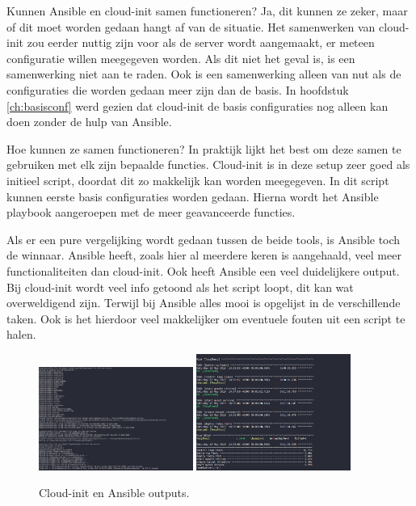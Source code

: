 \newpage
Kunnen Ansible en cloud-init samen functioneren? Ja, dit kunnen ze zeker, maar of dit moet worden gedaan hangt af van de situatie. Het samenwerken van cloud-init zou eerder nuttig zijn voor als de server wordt aangemaakt, er meteen configuratie willen meegegeven worden. Als dit niet het geval is, is een samenwerking niet aan te raden. Ook is een samenwerking alleen van nut als de configuraties die worden gedaan meer zijn dan de basis. In hoofdstuk \ref{ch:basisconf} werd gezien dat cloud-init de basis configuraties nog alleen kan doen zonder de hulp van Ansible.

Hoe kunnen ze samen functioneren? In praktijk lijkt het best om deze samen te gebruiken met elk zijn bepaalde functies. Cloud-init is in deze setup zeer goed als initieel script, doordat dit zo makkelijk kan worden meegegeven. In dit script kunnen eerste basis configuraties worden gedaan. Hierna wordt het Ansible playbook aangeroepen met de meer geavanceerde functies.

Als er een pure vergelijking wordt gedaan tussen de beide tools, is Ansible toch de winnaar. Ansible heeft, zoals hier al meerdere keren is aangehaald, veel meer functionaliteiten dan cloud-init. Ook heeft Ansible een veel duidelijkere output. Bij cloud-init wordt veel info getoond als het script loopt, dit kan wat overweldigend zijn. Terwijl bij Ansible alles mooi is opgelijst in de verschillende taken. Ook is het hierdoor veel makkelijker om eventuele fouten uit een script te halen.
\begin{figure}[!htb]
    \centering
    {{\includegraphics[width=0.45\textwidth]{img/cloudoutput.png} }}%
    \qquad
    {{\includegraphics[width=0.45\textwidth]{img/ansibleoutput.png} }}%
    \caption{Cloud-init en Ansible outputs.}%
    \label{fig:outputs}%
\end{figure}

